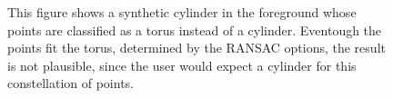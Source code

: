 \begin{figure}
\centering
{}%
{}    

  
\caption{This figure shows a synthetic cylinder in the foreground whose points are classified as a torus instead of a cylinder. Eventough the points fit the torus, determined by the RANSAC options, the result is not plausible, since the user would expect a cylinder for this constellation of points. }
\label{fig:missfittedTorus}
\end{figure}



